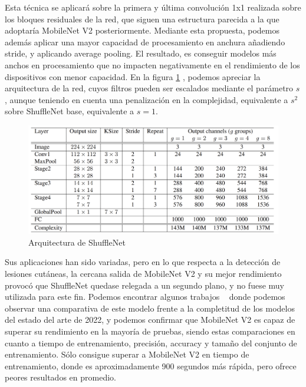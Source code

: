 Esta técnica se aplicará sobre la primera y última convolución 1x1 realizada sobre los bloques residuales de la red, que siguen una estructura parecida a la que adoptaría MobileNet V2 posteriormente. Mediante esta propuesta, podemos además aplicar una mayor capacidad de procesamiento en anchura añadiendo stride, y aplicando average pooling. El resultado, es conseguir modelos más anchos en procesamiento que no impacten negativamente en el rendimiento de los dispositivos con menor capacidad. En la figura \ref{arquitecturashuffle} , podemos apreciar la arquitectura de la red, cuyos filtros pueden ser escalados mediante el parámetro $s$, aunque teniendo en cuenta una penalización en la complejidad, equivalente a $s^2$ sobre ShuffleNet base, equivalente a $s=1$.

\begin{figure}[H]

		\centering
		\includegraphics[scale = 0.2]{imagenes/arquitecturashuffle.png}
		\caption{Arquitectura de ShuffleNet \cite{zhang2017shufflenet}}
		\label{arquitecturashuffle}
	\end{figure}

Sus aplicaciones han sido variadas, pero en lo que respecta a la detección de lesiones cutáneas, la cercana salida de MobileNet V2 y su mejor rendimiento provocó que ShuffleNet quedase relegada a un segundo plano, y no fuese muy utilizada para este fin. Podemos encontrar algunos trabajos ~\cite{shuffleapp} donde podemos observar una comparativa de este modelo frente a la completitud de los modelos del estado del arte de 2022, y podemos confirmar que  MobileNet V2 es capaz de superar su rendimiento en la mayoría de pruebas, siendo estas comparaciones en cuanto a tiempo de entrenamiento, precisión, accuracy y tamaño del conjunto de entrenamiento. Sólo consigue superar a MobileNet V2 en tiempo de entrenamiento, donde es aproximadamente 900 segundos más rápida, pero ofrece peores resultados en promedio.


